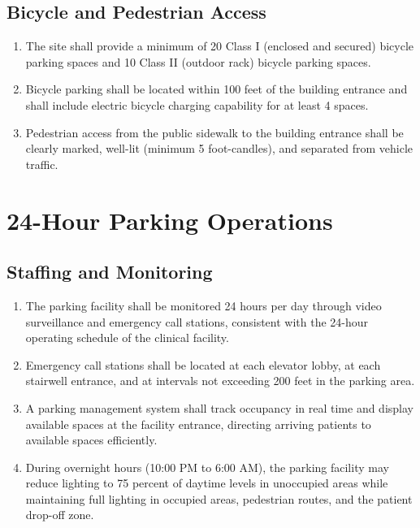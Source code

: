 \subsection{Bicycle and Pedestrian Access}

\begin{enumerate}[label=(\alph*)]
\item The site shall provide a minimum of 20 Class I (enclosed and secured)
  bicycle parking spaces and 10 Class II (outdoor rack) bicycle parking spaces.

\item Bicycle parking shall be located within 100 feet of the building entrance
  and shall include electric bicycle charging capability for at least 4 spaces.

\item Pedestrian access from the public sidewalk to the building entrance shall
  be clearly marked, well-lit (minimum 5 foot-candles), and separated from
  vehicle traffic.
\end{enumerate}

\section{24-Hour Parking Operations}

\subsection{Staffing and Monitoring}

\begin{enumerate}[label=(\alph*)]
\item The parking facility shall be monitored 24 hours per day through video
  surveillance and emergency call stations, consistent with the 24-hour
  operating schedule of the clinical facility.

\item Emergency call stations shall be located at each elevator lobby, at each
  stairwell entrance, and at intervals not exceeding 200 feet in the parking
  area.

\item A parking management system shall track occupancy in real time and display
  available spaces at the facility entrance, directing arriving patients to
  available spaces efficiently.

\item During overnight hours (10:00 PM to 6:00 AM), the parking facility may
  reduce lighting to 75 percent of daytime levels in unoccupied areas while
  maintaining full lighting in occupied areas, pedestrian routes, and the
  patient drop-off zone.
\end{enumerate}

